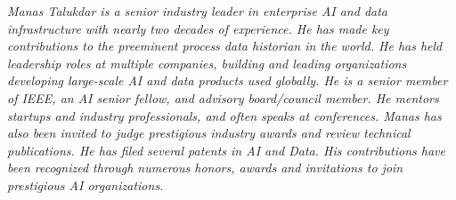 {\selectfont
	\begin{justify}\textit{Manas Talukdar is a senior industry leader in enterprise AI and data infrastructure with nearly two decades of experience. He has made key contributions to the preeminent process data historian in the world. He has held leadership roles at multiple companies, building and leading organizations developing large-scale AI and data products used globally. He is a senior member of IEEE, an AI senior fellow, and advisory board/council member. He mentors startups and industry professionals, and often speaks at conferences. Manas has also been invited to judge prestigious industry awards and review technical publications. He has filed several patents in AI and Data. His contributions have been recognized through numerous honors, awards and invitations to join prestigious AI organizations.}\end{justify}
}
\vspace{-12pt}
